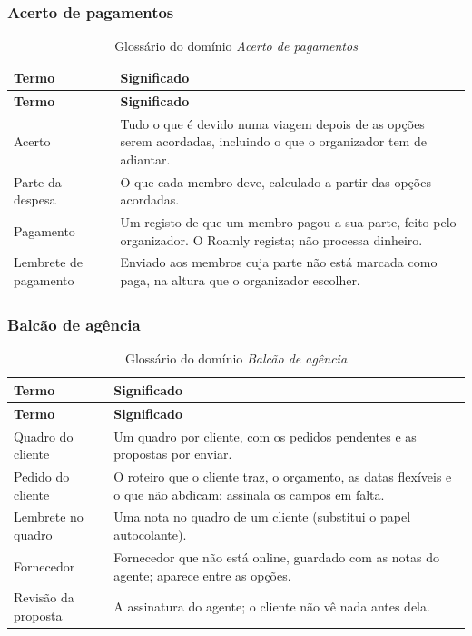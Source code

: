 \subsubsection{Acerto de pagamentos}

\begin{longtable}{@{}p{4cm}p{11.3cm}@{}}
\caption{Glossário do domínio \textit{Acerto de pagamentos}}\label{tab:glossario-pagamentos}\\
\toprule \textbf{Termo} & \textbf{Significado} \\ \midrule \endfirsthead
\toprule \textbf{Termo} & \textbf{Significado} \\ \midrule \endhead
Acerto & Tudo o que é devido numa viagem depois de as opções serem acordadas, incluindo o que o organizador tem de adiantar.  \\
Parte da despesa & O que cada membro deve, calculado a partir das opções acordadas.  \\
Pagamento & Um registo de que um membro pagou a sua parte, feito pelo organizador. O Roamly regista; não processa dinheiro.  \\
Lembrete de pagamento & Enviado aos membros cuja parte não está marcada como paga, na altura que o organizador escolher.  \\
\bottomrule
\end{longtable}

\subsubsection{Balcão de agência}

\begin{longtable}{@{}p{4cm}p{11.3cm}@{}}
\caption{Glossário do domínio \textit{Balcão de agência}}\label{tab:glossario-agência}\\
\toprule \textbf{Termo} & \textbf{Significado} \\ \midrule \endfirsthead
\toprule \textbf{Termo} & \textbf{Significado} \\ \midrule \endhead
Quadro do cliente & Um quadro por cliente, com os pedidos pendentes e as propostas por enviar.  \\
Pedido do cliente & O roteiro que o cliente traz, o orçamento, as datas flexíveis e \guillemotleft{}o que não abdicam\guillemotright{}; assinala os campos em falta.  \\
Lembrete no quadro & Uma nota no quadro de um cliente (substitui o papel autocolante).  \\
Fornecedor & Fornecedor que não está online, guardado com as notas do agente; aparece entre as opções.  \\
Revisão da proposta & A assinatura do agente; o cliente não vê nada antes dela.  \\
\bottomrule
\end{longtable}